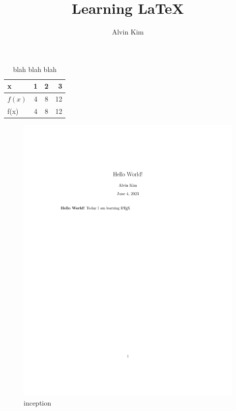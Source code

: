 \documentclass{article}
\title{Learning LaTeX}
\author{Alvin Kim}
\begin{document}
    \maketitle

    \begin{table}[hbt!]
        \caption{blah blah blah}
        \begin{center}
            \begin{tabular}{|l||c|c|r|}
                \hline
                x&1&2&3\\
                \hline
                $f(x)$&4&8&12\\
                f(x)&4&8&12\\
                \hline
            \end{tabular}
        \end{center}
    \end{table}

    \begin{figure}
        \includegraphics[width=\textwidth]{Exercise-1}
        \caption{inception}
    \end{figure}
\end{document}
